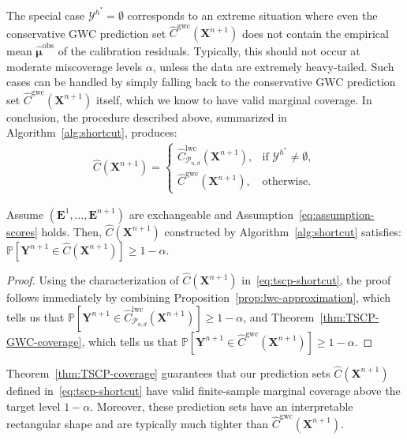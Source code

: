 The special case $\mathcal{Y}^{h^*} = \emptyset$ corresponds to an extreme situation where even the conservative GWC prediction set $\hat{C}^\mathrm{gwc}(\mathbf{X}^{n+1})$ does not contain the empirical mean $\hat{\boldsymbol\mu}^\mathrm{obs}$ of the calibration residuals. Typically, this should not occur at moderate miscoverage levels $\alpha$, unless the data are extremely heavy-tailed. Such cases can be handled by simply falling back to the conservative GWC prediction set $\hat{C}^\mathrm{gwc}(\mathbf{X}^{n+1})$ itself, which we know to have valid marginal coverage. In conclusion, the procedure described above, summarized in Algorithm~\ref{alg:shortcut}, produces:
\begin{align} \label{eq:tscp-shortcut}
  \hat{C}(\mathbf{X}^{n+1}) = \begin{cases}
  \hat{C}^\mathrm{lwc}_{\mathcal{P}_{n,d}}(\mathbf{X}^{n+1}), &\text{if }\mathcal{Y}^{h^*} \neq \emptyset, \\
\hat{C}^\mathrm{gwc}(\mathbf{X}^{n+1}), &\text{otherwise.}
\end{cases}
\end{align}
\begin{theorem} \label{thm:TSCP-coverage}
Assume $(\mathbf{E}^1,\ldots,\mathbf{E}^{n+1})$ are exchangeable and Assumption~\ref{eq:assumption-scores} holds.
Then, $\hat{C}(\mathbf{X}^{n+1})$ constructed by Algorithm~\ref{alg:shortcut} satisfies: $\mathbb{P}[ \mathbf{Y}^{n+1} \in \hat{C}(\mathbf{X}^{n+1}) ] \ge 1 - \alpha$.
\end{theorem}
\begin{proof}
Using the characterization of $\hat{C}(\mathbf{X}^{n+1})$ in~\eqref{eq:tscp-shortcut}, the proof follows immediately by combining Proposition~\ref{prop:lwc-approximation}, which tells us that $\mathbb{P}[ \mathbf{Y}^{n+1} \in \hat{C}^{\mathrm{lwc}}_{\mathcal{P}_{n,d}}(\mathbf{X}^{n+1}) ] \ge 1 - \alpha$, and Theorem~\ref{thm:TSCP-GWC-coverage}, which tells us that $\mathbb{P}[ \mathbf{Y}^{n+1} \in \hat{C}^{\mathrm{gwc}}(\mathbf{X}^{n+1}) ] \ge 1 - \alpha$.
\end{proof}

Theorem~\ref{thm:TSCP-coverage} guarantees that our prediction sets $\hat{C}(\mathbf{X}^{n+1})$ defined in~\eqref{eq:tscp-shortcut} have valid finite-sample marginal coverage above the target level $1-\alpha$.
Moreover, these prediction sets have an interpretable rectangular shape and are typically much tighter than $\hat{C}^\mathrm{gwc}(\mathbf{X}^{n+1})$.


